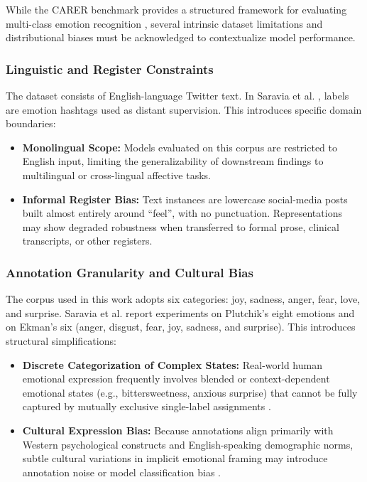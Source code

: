 \documentclass[conference]{IEEEtran}
\begin{document}
While the CARER benchmark provides a structured framework for evaluating multi-class emotion recognition \cite{saravia2018carer}, 
several intrinsic dataset limitations and distributional biases must be acknowledged to contextualize model performance.

\subsubsection{Linguistic and Register Constraints}
The dataset consists of English-language Twitter text. In Saravia et al. \cite{saravia2018carer}, labels are emotion hashtags used as distant supervision. 
This introduces specific domain boundaries:

\begin{itemize}
    \item \textbf{Monolingual Scope:} Models evaluated on this corpus are restricted to English input, limiting the generalizability of downstream findings to multilingual or cross-lingual affective tasks.
    \item \textbf{Informal Register Bias:} Text instances are lowercase social-media posts built almost entirely around ``feel'', with no punctuation. Representations may show degraded robustness when transferred to formal prose, clinical transcripts, or other registers.
\end{itemize}

\subsubsection{Annotation Granularity and Cultural Bias}
The corpus used in this work adopts six categories: joy, sadness, anger, fear, love, and surprise. Saravia et al. \cite{saravia2018carer} report experiments on Plutchik's eight emotions and on Ekman's six (anger, disgust, fear, joy, sadness, and surprise). 
This introduces structural simplifications:

\begin{itemize}
    \item \textbf{Discrete Categorization of Complex States:} Real-world human emotional expression frequently involves blended or context-dependent emotional states (e.g., bittersweetness, anxious surprise) that cannot be fully captured by mutually exclusive single-label assignments \cite{cheng2026personality}.
    \item \textbf{Cultural Expression Bias:} Because annotations align primarily with Western psychological constructs and English-speaking demographic norms, subtle cultural variations in implicit emotional framing may introduce annotation noise or model classification bias \cite{chakriswaran2019emotion}.
\end{itemize}
\end{document}
